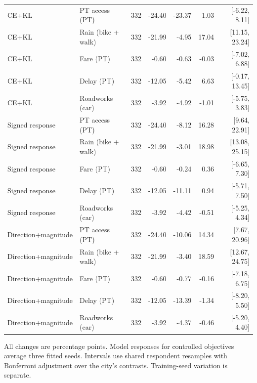 \begin{longtable}{@{\extracolsep{\fill}}llrrrrr@{}}
CE+KL & PT access (PT) & 332 & -24.40 & -23.37 & 1.03 & [-6.22, 8.11] \\
CE+KL & Rain (bike + walk) & 332 & -21.99 & -4.95 & 17.04 & [11.15, 23.24] \\
CE+KL & Fare (PT) & 332 & -0.60 & -0.63 & -0.03 & [-7.02, 6.88] \\
CE+KL & Delay (PT) & 332 & -12.05 & -5.42 & 6.63 & [-0.17, 13.45] \\
CE+KL & Roadworks (car) & 332 & -3.92 & -4.92 & -1.01 & [-5.75, 3.83] \\
Signed response & PT access (PT) & 332 & -24.40 & -8.12 & 16.28 & [9.64, 22.91] \\
Signed response & Rain (bike + walk) & 332 & -21.99 & -3.01 & 18.98 & [13.08, 25.15] \\
Signed response & Fare (PT) & 332 & -0.60 & -0.24 & 0.36 & [-6.65, 7.30] \\
Signed response & Delay (PT) & 332 & -12.05 & -11.11 & 0.94 & [-5.71, 7.50] \\
Signed response & Roadworks (car) & 332 & -3.92 & -4.42 & -0.51 & [-5.25, 4.34] \\
Direction+magnitude & PT access (PT) & 332 & -24.40 & -10.06 & 14.34 & [7.67, 20.96] \\
Direction+magnitude & Rain (bike + walk) & 332 & -21.99 & -3.40 & 18.59 & [12.67, 24.75] \\
Direction+magnitude & Fare (PT) & 332 & -0.60 & -0.77 & -0.16 & [-7.18, 6.75] \\
Direction+magnitude & Delay (PT) & 332 & -12.05 & -13.39 & -1.34 & [-8.20, 5.50] \\
Direction+magnitude & Roadworks (car) & 332 & -3.92 & -4.37 & -0.46 & [-5.20, 4.40] \\\end{longtable}
\noindent All changes are percentage points. Model responses for controlled objectives average three fitted seeds. Intervals use shared respondent resamples with Bonferroni adjustment over the city's contrasts. Training-seed variation is separate.
\endgroup
